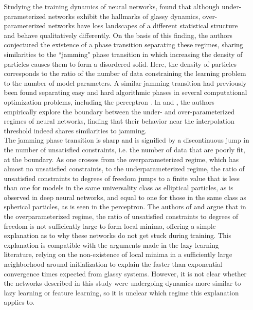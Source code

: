 \documentclass[11pt]{article}
\begin{document}
Studying the training dynamics of neural networks, \cite{baity-jesiComparingDynamicsDeep2019} found that although under-parameterized networks exhibit the hallmarks of glassy dynamics, over-parameterized networks have loss landscapes of a different statistical structure and behave qualitatively differently. On the basis of this finding, the authors conjectured the existence of a phase transition separating these regimes, sharing similarities to the ``jamming" phase transition in which increasing the density of particles causes them to form a disordered solid. Here, the density of particles corresponds to the ratio of the number of data constraining the learning problem to the number of model parameters. A similar jamming transition had previously been found separating easy and hard algorithmic phases in several computational optimization problems, including the perceptron \cite{krzakalaLandscapeAnalysisConstraint2007,zdeborovaPhaseTransitionsColoring2007,franzUniversalitySATUNSATJamming2017}. In \cite{geigerJammingTransitionParadigm2019} and \cite{spiglerJammingTransitionOverparametrization2019}, the authors empirically explore the boundary between the under- and over-parameterized regimes of neural networks, finding that their behavior near the interpolation threshold indeed shares similarities to jamming.\\

The jamming phase transition is sharp and is signified by a discontinuous jump in the number of unsatisfied constraints, i.e. the number of data that are poorly fit, at the boundary. As one crosses from the overparameterized regime, which has almost no unsatisfied constraints, to the underparameterized regime, the ratio of unsatisfied constraints to degrees of freedom jumps to a finite value that is less than one for models in the same universality class as elliptical particles, as is observed in deep neural networks, and equal to one for those in the same class as spherical particles, as is seen in the perceptron. The authors of \cite{geigerJammingTransitionParadigm2019} and \cite{spiglerJammingTransitionOverparametrization2019} argue that in the overparameterized regime, the ratio of unsatisfied constraints to degrees of freedom is not sufficiently large to form local minima, offering a simple explanation as to why these networks do not get stuck during training. This explanation is compatible with the arguments made in the lazy learning literature, relying on the non-existence of local minima in a sufficiently large neighborhood around initialization to explain the faster than exponential convergence times expected from glassy systems. However, it is not clear whether the networks described in this study were undergoing dynamics more similar to lazy learning or feature learning, so it is unclear which regime this explanation applies to.
\end{document}
